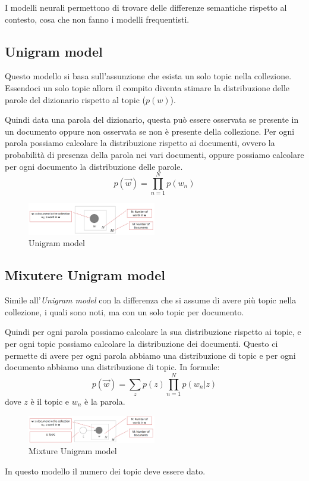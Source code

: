 I modelli neurali permettono di trovare delle differenze semantiche rispetto al
contesto, cosa che non fanno i modelli frequentisti.
\subsection{Unigram model}
Questo modello si basa sull'assunzione che esista un solo topic nella collezione.
Essendoci un solo topic allora il compito diventa stimare la distribuzione delle
parole del dizionario rispetto al topic ($p(w)$).

Quindi data una parola del dizionario, questa può essere osservata se presente
in un documento oppure non osservata se non è presente della collezione.
Per ogni parola possiamo calcolare la distribuzione rispetto ai documenti,
ovvero la probabilità di presenza della parola nei vari documenti, oppure possiamo
calcolare per ogni documento la distribuzione delle parole.
\begin{equation}
      p(\vec{w}) = \prod_{n = 1}^{N} p(w_n)
\end{equation}
\begin{figure}[!ht]
      \centering
      \includegraphics[width=0.5\textwidth]{./img/nlp/unigram.png}
      \caption{Unigram model}
      \label{fig:unigram}
\end{figure}
\subsection{Mixutere Unigram model}
Simile all'\textit{Unigram model} con la differenza che si assume di avere più
topic nella collezione, i quali sono noti, ma con un solo topic per documento.

Quindi per ogni parola possiamo calcolare la sua distribuzione rispetto ai topic,
e per ogni topic possiamo calcolare la distribuzione dei documenti. Questo ci
permette di avere per ogni parola abbiamo una distribuzione di topic e per ogni
documento abbiamo una distribuzione di topic. In formule:
\begin{equation}
      p(\vec{w}) = \sum_z p(z) \prod_{n = 1}^{N} p(w_n|z)
\end{equation}
dove $z$ è il topic e $w_n$ è la parola.
\begin{figure}[!ht]
      \centering
      \includegraphics[width=0.5\textwidth]{./img/nlp/mixture.png}
      \caption{Mixture Unigram model}
      \label{fig:mixture_unigram}
\end{figure}
\begin{nota}
      In questo modello il numero dei topic deve essere dato.
\end{nota}
